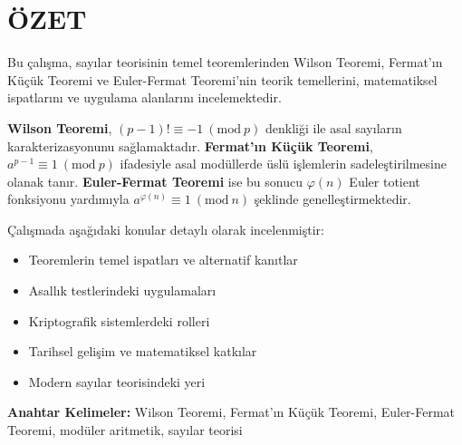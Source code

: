 \documentclass[a4paper,12pt]{article}
\begin{document}
\clearpage
\section*{ÖZET}

Bu çalışma, sayılar teorisinin temel teoremlerinden Wilson Teoremi, Fermat'ın Küçük Teoremi ve Euler-Fermat Teoremi'nin teorik temellerini, matematiksel ispatlarını ve uygulama alanlarını incelemektedir.

\textbf{Wilson Teoremi}, $(p-1)! \equiv -1 \ (\mathrm{mod}\ p)$ denkliği ile asal sayıların karakterizasyonunu sağlamaktadır. \textbf{Fermat'ın Küçük Teoremi}, $a^{p-1} \equiv 1 \ (\mathrm{mod}\ p)$ ifadesiyle asal modüllerde üslü işlemlerin sadeleştirilmesine olanak tanır. \textbf{Euler-Fermat Teoremi} ise bu sonucu $\varphi(n)$ Euler totient fonksiyonu yardımıyla $a^{\varphi(n)} \equiv 1 \ (\mathrm{mod}\ n)$ şeklinde genelleştirmektedir.

Çalışmada aşağıdaki konular detaylı olarak incelenmiştir:

\begin{itemize}
    \item Teoremlerin temel ispatları ve alternatif kanıtlar
    \item Asallık testlerindeki uygulamaları
    \item Kriptografik sistemlerdeki rolleri
    \item Tarihsel gelişim ve matematiksel katkılar
    \item Modern sayılar teorisindeki yeri
\end{itemize}

\vspace{0.5cm}
\noindent\textbf{Anahtar Kelimeler:} Wilson Teoremi, Fermat'ın Küçük Teoremi, Euler-Fermat Teoremi, modüler aritmetik, sayılar teorisi
\end{document}
